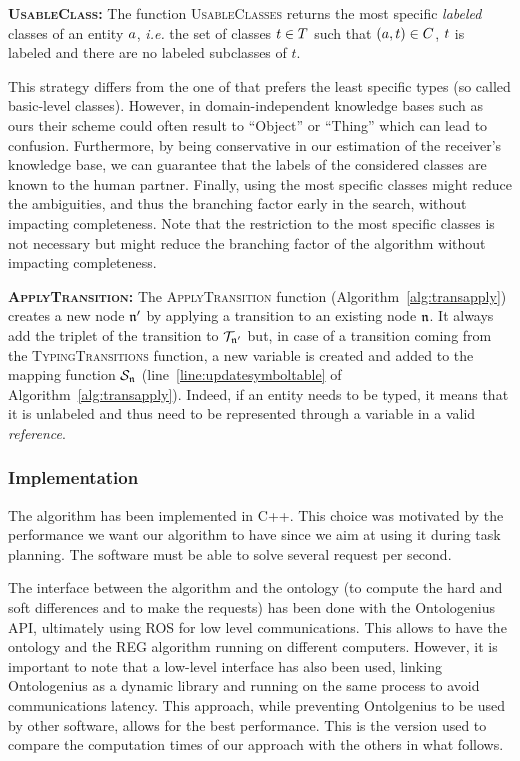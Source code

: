 \documentclass[a4paper,11pt,twoside]{StyleThese}
\begin{document}
\textbf{\textsc{UsableClass}:}
The function \textsc{UsableClasses} returns the most specific \textit{labeled} classes of an entity $a$, \textit{i.e.} the set of classes $t \in T$ such that $(a, t) \in C$, $t$ is labeled and there are no labeled subclasses of $t$.

This strategy differs from the one of \cite{dale1995computational} that prefers the least specific types (so called basic-level classes).
However, in domain-independent knowledge bases such as ours their scheme could often result to ``Object'' or ``Thing'' which can lead to confusion.
Furthermore, by being conservative in our estimation of the receiver's knowledge base, we can guarantee that the labels of the considered classes are known to the human partner.
Finally, using the most specific classes might reduce the ambiguities, and thus the branching factor early in the search, without impacting completeness.
Note that the restriction to the most specific classes is not necessary but might reduce the branching factor of the algorithm without impacting completeness.

\textbf{\textsc{ApplyTransition}:}
The \textsc{ApplyTransition} function (Algorithm~\ref{alg:transapply}) creates a new node $\mathfrak{n}'$ by applying a transition to an existing node $\mathfrak{n}$. It always add the triplet of the transition to $\mathcal{T}_{\mathfrak{n}'}$ but, in case of a transition coming from the \textsc{TypingTransitions} function, a new variable is created and added to the mapping function $\mathcal{S}_{\mathfrak{n}}$ (line~\ref{line:updatesymboltable} of Algorithm~\ref{alg:transapply}). Indeed, if an entity needs to be typed, it means that it is unlabeled and thus need to be represented through a variable in a valid \textit{reference}.



\subsubsection{Implementation}

The algorithm has been implemented in C++. This choice was motivated by the performance we want our algorithm to have since we aim at using it during task planning. The software must be able to solve several request per second.

The interface between the algorithm and the ontology (to compute the hard and soft differences and to make the \sparql{} requests) has been done with the Ontologenius API, ultimately using ROS for low level communications. This allows to have the ontology and the REG algorithm running on different computers. However, it is important to note that a low-level interface has also been used, linking Ontologenius as a dynamic library and running on the same process to avoid communications latency. This approach, while preventing Ontolgenius to be used by other software, allows for the best performance. This is the version used to compare the computation times of our approach with the others in what follows.
\end{document}

